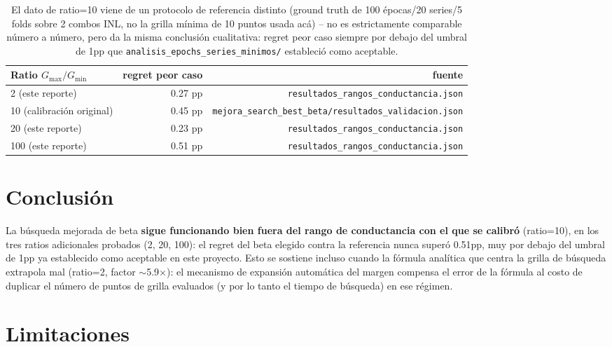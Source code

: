 \documentclass[11pt]{article}
\begin{document}
\begin{table}[htbp]
\centering
\begin{tabular}{@{}lrr@{}}
\toprule
Ratio $G_{\max}/G_{\min}$ & regret peor caso & fuente \\
\midrule
2 (este reporte)             & 0.27 pp & \texttt{resultados\_rangos\_conductancia.json} \\
10 (calibración original)    & 0.45 pp & \texttt{mejora\_search\_best\_beta/resultados\_validacion.json} \\
20 (este reporte)            & 0.23 pp & \texttt{resultados\_rangos\_conductancia.json} \\
100 (este reporte)           & 0.51 pp & \texttt{resultados\_rangos\_conductancia.json} \\
\bottomrule
\end{tabular}
\caption{El dato de ratio=10 viene de un protocolo de referencia distinto (ground truth de 100
épocas/20 series/5 folds sobre 2 combos INL, no la grilla mínima de 10 puntos usada acá) -- no
es estrictamente comparable número a número, pero da la misma conclusión cualitativa: regret
peor caso siempre por debajo del umbral de 1pp que \texttt{analisis\_epochs\_series\_minimos/}
estableció como aceptable.}
\end{table}

\section{Conclusión}

La búsqueda mejorada de beta \textbf{sigue funcionando bien fuera del rango de conductancia con
el que se calibró} (ratio=10), en los tres ratios adicionales probados (2, 20, 100): el regret
del beta elegido contra la referencia nunca superó 0.51pp, muy por debajo del umbral de 1pp ya
establecido como aceptable en este proyecto. Esto se sostiene incluso cuando la fórmula
analítica que centra la grilla de búsqueda extrapola mal (ratio=2, factor $\sim$5.9$\times$):
el mecanismo de expansión automática del margen compensa el error de la fórmula al costo de
duplicar el número de puntos de grilla evaluados (y por lo tanto el tiempo de búsqueda) en ese
régimen.

\section{Limitaciones}
\end{document}
